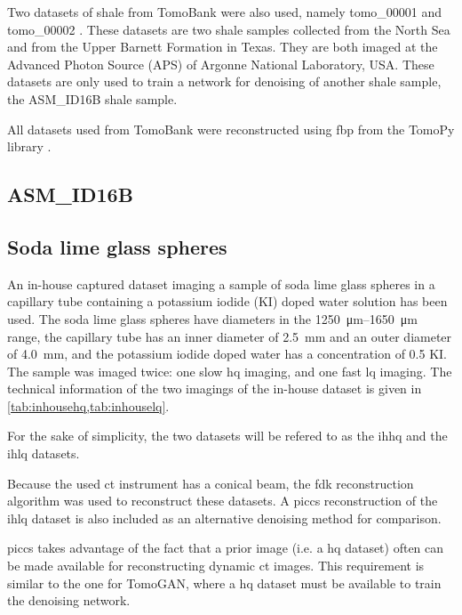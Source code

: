 Two datasets of shale from TomoBank were also used, namely tomo\_00001 and tomo\_00002 \cite{datasetshale}. These datasets are two shale samples collected from the North Sea and from the Upper Barnett Formation in Texas. They are both imaged at the Advanced Photon Source (APS) of Argonne National Laboratory, USA. These datasets are only used to train a network for denoising of another shale sample, the ASM\_ID16B shale sample. 

All datasets used from TomoBank were reconstructed using \gls{fbp} from the TomoPy library \cite{tomopy}. 

\subsection{ASM\_ID16B}

\subsection{Soda lime glass spheres}
An in-house captured dataset imaging a sample of soda lime glass spheres in a capillary tube containing a potassium iodide (KI) doped water solution has been used. The soda lime glass spheres have diameters in the \SIrange{1250}{1650}{\micro \meter} range, the capillary tube has an inner diameter of \SI{2.5}{\milli \meter} and an outer diameter of \SI{4.0}{\milli \meter}, and the potassium iodide doped water has a concentration of \SI{0.5}{\molar} KI. The sample was imaged twice: one slow \acrlong{hq} imaging, and one fast \acrlong{lq} imaging. The technical information of the two imagings of the in-house dataset is given in \cref{tab:inhousehq,tab:inhouselq}.

For the sake of simplicity, the two datasets will be refered to as the \gls{ihhq} and the \gls{ihlq} datasets. 

Because the used \gls{ct} instrument has a conical beam, the \gls{fdk} reconstruction algorithm was used to reconstruct these datasets. A \gls{piccs} reconstruction of the \gls{ihlq} dataset is also included as an alternative denoising method for comparison. 

\gls{piccs} takes advantage of the fact that a prior image (i.e. a \gls{hq} dataset) often can be made available for reconstructing dynamic \gls{ct} images. This requirement is similar to the one for TomoGAN, where a \gls{hq} dataset must be available to train the denoising network. 

